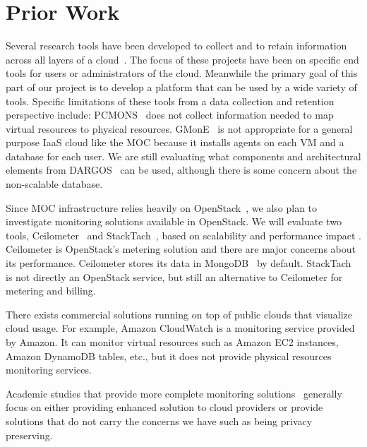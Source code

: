 

\section{Prior Work}
\label{sec:PriorWork}

%

Several research tools have been developed to collect and to retain information across all layers of  a cloud~\cite{chaves2011toward,montes2013gmone,povedano2013dargos,alcaraz2015monpaas}.  The focus of these projects have been on specific end tools for users or administrators of the cloud. Meanwhile the primary goal of this part of our project is to develop a platform that can be used by a wide variety of tools. Specific limitations of these tools from a data collection and retention perspective include:  PCMONS~\cite{chaves2011toward} does not collect information needed to map virtual resources to physical resources. GMonE~\cite{montes2013gmone} is not appropriate for a general purpose IaaS cloud like the MOC because  it installs agents on each VM and a database for each user.  We are still evaluating what components and architectural elements from DARGOS~\cite{povedano2013dargos} can be used, although there is some concern about the non-scalable database. 

Since MOC infrastructure relies heavily on OpenStack~\cite{sefraoui2012openstack}, we also plan to investigate monitoring solutions available in OpenStack. We will evaluate two tools, Ceilometer~\cite{ceilometer} and  StackTach~\cite{stacktach}, based on scalability and performance impact . Ceilometer is OpenStack’s metering solution and there are major concerns about its performance. Ceilometer stores its data in MongoDB~\cite{mongodb} by default. StackTach~\cite{stacktach} is not directly an OpenStack service, but still an alternative to Ceilometer for metering and billing.

There exists commercial solutions running on top of public clouds that visualize cloud usage. For example, Amazon CloudWatch is a monitoring service provided by Amazon. It can monitor virtual resources such as Amazon EC2 instances, Amazon DynamoDB tables, etc., but it does not provide physical resources monitoring services. 

Academic studies that provide more complete monitoring solutions~\cite{chaves2011toward, montes2013gmone, povedano2013dargos, alcaraz2015monpaas} generally focus on either providing enhanced solution to cloud providers or provide solutions that do not carry the concerns we have such as being privacy preserving.